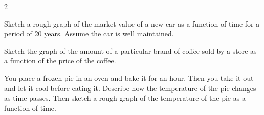 \documentclass{sebase}
\begin{document}
\begin{multicols}{2}
\begin{ExerciseList}
%

\item[$\hfill $14.] Sketch a rough graph of the market value of a new car as
a function of time for a period of 20 years. Assume the car is well
maintained.

%

\item[$\hfill $15.] Sketch the graph of the amount of a particular brand of
coffee sold by a store as a function of the price of the coffee.

%

%

\item[$\hfill $16.] You place a frozen pie in an oven and bake it for an
hour. Then you take it out and let it cool before eating it. Describe how
the temperature of the pie changes as time passes. Then sketch a rough graph
of the temperature of the pie as a function of time.

%


\end{ExerciseList}
\end{multicols}
\end{document}
